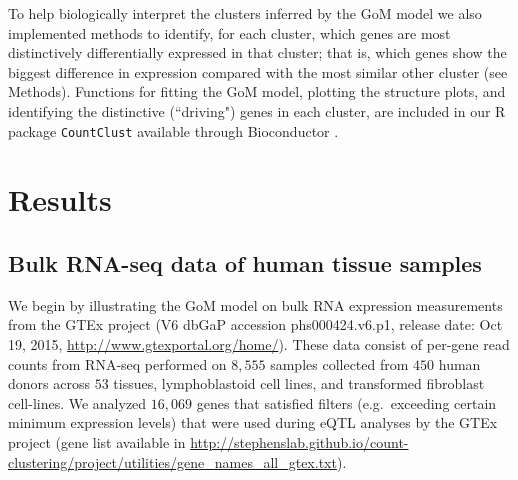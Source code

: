 \documentclass[10pt,letterpaper]{article}
\begin{document}

To help biologically interpret the clusters inferred by the GoM model we also implemented methods to identify, for each cluster, which genes
are most distinctively differentially expressed in that cluster; that is, which genes show the biggest difference in expression compared with the most similar other cluster (see Methods). Functions for fitting the GoM model, plotting the
structure plots, and identifying the distinctive (``driving") genes in each cluster, are included in our R package {\tt CountClust} \cite{Dey2016} available through Bioconductor \cite{Gentleman2003}.


\section*{Results}

\subsection*{Bulk RNA-seq data of human tissue samples}

We begin by illustrating the GoM model on bulk RNA expression measurements from the GTEx project (V6 dbGaP accession phs000424.v6.p1, release date: Oct 19, 2015, \url{http://www.gtexportal.org/home/}).  These data consist of per-gene read counts from RNA-seq performed on $8,555$ samples collected from $450$ human donors across $53$ tissues, lymphoblastoid cell lines, and transformed fibroblast cell-lines. We analyzed $16,069$ genes that satisfied filters (e.g.~exceeding certain minimum expression levels) that were used during eQTL analyses by the GTEx project (gene list available in \url{http://stephenslab.github.io/count-clustering/project/utilities/gene_names_all_gtex.txt}).
\end{document}
